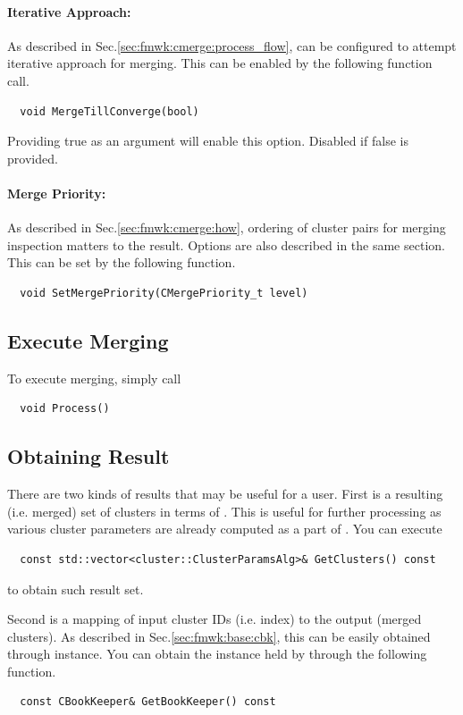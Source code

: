 \paragraph{Iterative Approach:}
As described in Sec.\ref{sec:fmwk:cmerge:process_flow}, {\cmerge} can be configured to attempt iterative approach for merging. This can be enabled by the following function call.
\begin{lstlisting}
  void MergeTillConverge(bool)
\end{lstlisting}
Providing {\ttfamily true} as an argument will enable this option. Disabled if {\ttfamily false} is provided.

\paragraph{Merge Priority:}
As described in Sec.\ref{sec:fmwk:cmerge:how}, ordering of cluster pairs for merging inspection matters to the result.
Options are also described in the same section. This can be set by the following function.
\begin{lstlisting}
  void SetMergePriority(CMergePriority_t level)
\end{lstlisting}

\subsection{Execute Merging}
To execute merging, simply call
\begin{lstlisting}
  void Process()
\end{lstlisting}

\subsection{Obtaining Result}
There are two kinds of results that may be useful for a user. First is a resulting (i.e. merged) set of clusters in terms of {\cpan}. This is useful for further processing as various cluster parameters are already computed as a part of {\cpan}. You can execute
\begin{lstlisting}
  const std::vector<cluster::ClusterParamsAlg>& GetClusters() const
\end{lstlisting}
to obtain such result set.

Second is a mapping of input cluster IDs (i.e. index) to the output (merged clusters). 
As described in Sec.\ref{sec:fmwk:base:cbk}, this can be easily obtained through {\cbkeeper} instance.
You can obtain the {\cbkeeper} instance held by {\cmerge} through the following function.
\begin{lstlisting}
  const CBookKeeper& GetBookKeeper() const
\end{lstlisting}
